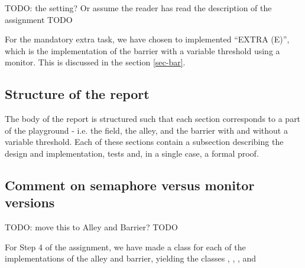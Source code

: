 TODO: the setting? Or assume the reader has read the description of the assignment TODO

For the mandatory extra task, we have chosen to implemented ``EXTRA (E)'', which is the implementation of the barrier with a variable threshold using a monitor. This is discussed in the section \ref{sec-bar}.

\subsection{Structure of the report}
The body of the report is structured such that each section corresponds to a part of the playground - i.e. the field, the alley, and the barrier with and without a variable threshold. Each of these sections contain a subsection describing the design and implementation, tests and, in a single case, a formal proof.


\subsection{Comment on semaphore versus monitor versions}
\label{sub:sema-vs-moni}
TODO: move this to Alley and Barrier? TODO

For Step 4 of the assignment, we have made a class for each of the implementations of the alley and barrier, yielding the classes , , , and 